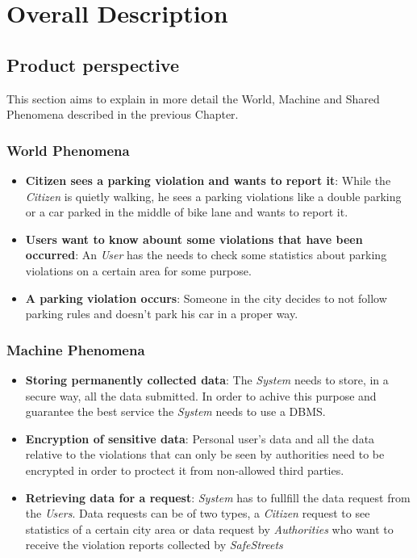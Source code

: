 \documentclass{article}
\begin{document}
\section{Overall Description}

\subsection{Product perspective}
This section aims to explain in more detail the World, Machine and Shared Phenomena described in the 
previous Chapter. 

\subsubsection{World Phenomena}
\begin{itemize}
    \item \textbf{Citizen sees a parking violation and wants to report it}:
    While the \textit{Citizen} is quietly walking, he sees a parking violations like a double parking or a car
    parked in the middle of bike lane and wants to report it.
    \item \textbf{Users want to know abount some violations that have been occurred}:
    An \textit{User} has the needs to check some statistics about parking violations on a certain area
    for some purpose.
    \item \textbf{A parking violation occurs}:
    Someone in the city decides to not follow parking rules and doesn't park his car in a proper way.
\end{itemize}

\subsubsection{Machine Phenomena}
\begin{itemize}
    \item \textbf{Storing permanently collected data}:
    The \textit{System} needs to store, in a secure way, all the data submitted.
    In order to achive this purpose and guarantee the best service
    the \textit{System} needs to use a DBMS.
    \item \textbf{Encryption of sensitive data}:
    Personal user's data and all the data relative to the violations
    that can only be seen by authorities need to be encrypted in order
    to proctect it from non-allowed third parties. 
    \item \textbf{Retrieving data for a request}:
    \textit{System} has to fullfill the data request from the \textit{Users}. Data 
    requests can be of two types, a \textit{Citizen} request to see
    statistics of a certain city area or data request by \textit{Authorities}
    who want to receive the violation reports collected by \textit{SafeStreets}
\end{itemize}
\end{document}
